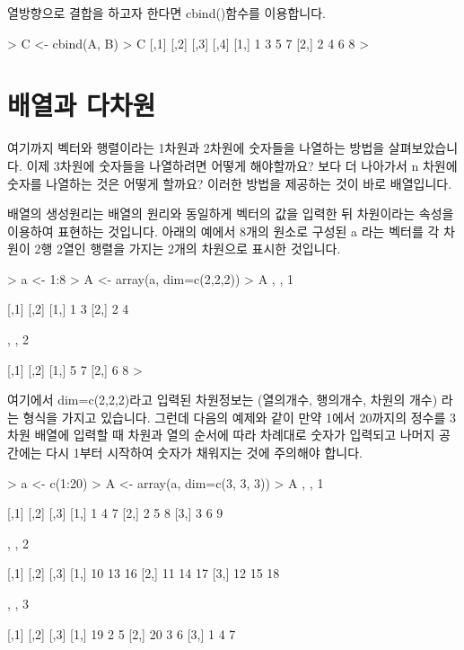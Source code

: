 열방향으로 결합을 하고자 한다면 cbind()함수를 이용합니다. 

\begin{Schunk}
\begin{Soutput}
> C <- cbind(A, B)
> C
     [,1] [,2] [,3] [,4]
[1,]    1    3    5    7
[2,]    2    4    6    8
> 
\end{Soutput}
\end{Schunk}



\section{배열과 다차원} 

여기까지 벡터와 행렬이라는 1차원과 2차원에 숫자들을 나열하는 방법을 살펴보았습니다.
이제 3차원에 숫자들을 나열하려면 어떻게 해야할까요? 
보다 더 나아가서 n 차원에 숫자를 나열하는 것은 어떻게 할까요?
이러한 방법을 제공하는 것이 바로 배열입니다. 

배열의 생성원리는 배열의 원리와 동일하게 벡터의 값을 입력한 뒤 차원이라는 속성을 이용하여 표현하는 것입니다.
아래의 예에서 8개의 원소로 구성된 a 라는 벡터를 각 차원이 2행 2열인 행렬을 가지는 2개의 차원으로 표시한 것입니다. 

\begin{Schunk}
\begin{Soutput}
> a <- 1:8
> A <- array(a, dim=c(2,2,2))
> A 
, , 1

     [,1] [,2]
[1,]    1    3
[2,]    2    4

, , 2

     [,1] [,2]
[1,]    5    7
[2,]    6    8
>
\end{Soutput}
\end{Schunk}

여기에서 dim=c(2,2,2)라고 입력된 차원정보는 (열의개수, 행의개수, 차원의 개수) 라는 형식을 가지고 있습니다. 
그런데 다음의 예제와 같이 만약 1에서 20까지의 정수를 3차원 배열에 입력할 때 차원과 열의 순서에 따라 차례대로 숫자가 입력되고 나머지 공간에는 다시 1부터 시작하여 숫자가 채워지는 것에 주의해야 합니다.


\begin{Schunk}
\begin{Soutput}

> a <- c(1:20)
> A <- array(a, dim=c(3, 3, 3))
> A
, , 1

     [,1] [,2] [,3]
[1,]    1    4    7
[2,]    2    5    8
[3,]    3    6    9

, , 2

     [,1] [,2] [,3]
[1,]   10   13   16
[2,]   11   14   17
[3,]   12   15   18

, , 3

     [,1] [,2] [,3]
[1,]   19    2    5
[2,]   20    3    6
[3,]    1    4    7
\end{Soutput}
\end{Schunk}

